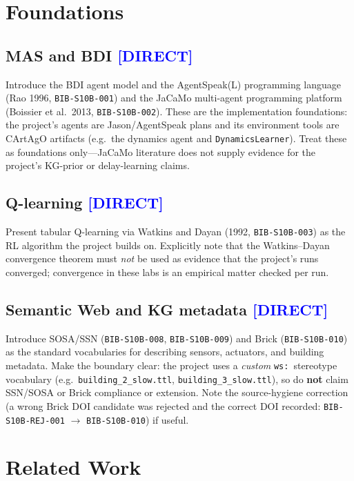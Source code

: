 \documentclass[12pt, a4paper, oneside]{memoir}
\newcommand{\evDirect}{\textcolor{blue}{[DIRECT]}}
\begin{document}
\section{Foundations}
\label{sec:bg-foundations}

\subsection{MAS and BDI \evDirect}

Introduce the BDI agent model and the AgentSpeak(L) programming language
(Rao 1996, \texttt{BIB-S10B-001}) and the JaCaMo multi-agent programming
platform (Boissier et al.\ 2013, \texttt{BIB-S10B-002}).  These are the
implementation foundations: the project's agents are Jason/AgentSpeak plans
and its environment tools are CArtAgO artifacts (e.g.\ the dynamics agent
and \texttt{DynamicsLearner}).  Treat these as foundations only---JaCaMo
literature does not supply evidence for the project's KG-prior or
delay-learning claims.

\subsection{Q-learning \evDirect}

Present tabular Q-learning via Watkins and Dayan (1992,
\texttt{BIB-S10B-003}) as the RL algorithm the project builds on.
Explicitly note that the Watkins--Dayan convergence theorem must \emph{not}
be used as evidence that the project's runs converged; convergence in these
labs is an empirical matter checked per run.

\subsection{Semantic Web and KG metadata \evDirect}

Introduce SOSA/SSN (\texttt{BIB-S10B-008}, \texttt{BIB-S10B-009}) and Brick
(\texttt{BIB-S10B-010}) as the standard vocabularies for describing sensors,
actuators, and building metadata.  Make the boundary clear: the project uses
a \emph{custom} \texttt{ws:}~stereotype vocabulary (e.g.\
\texttt{building\_2\_slow.ttl}, \texttt{building\_3\_slow.ttl}), so do
\textbf{not} claim SSN/SOSA or Brick compliance or extension.  Note the
source-hygiene correction (a wrong Brick DOI candidate was rejected and the
correct DOI recorded: \texttt{BIB-S10B-REJ-001} $\to$ \texttt{BIB-S10B-010})
if useful.

\section{Related Work}
\label{sec:bg-relwork}
\end{document}
